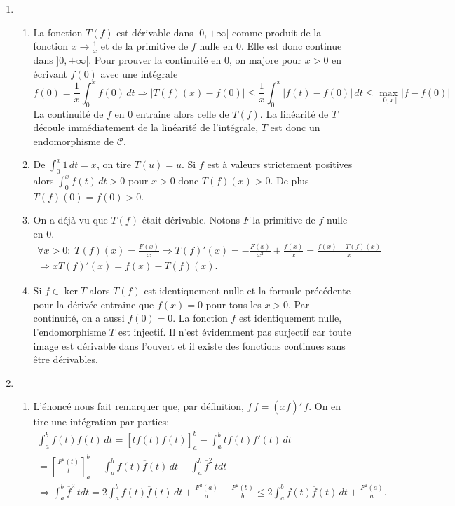 \begin{enumerate}
 \item
\begin{enumerate}
 \item La fonction $T(f)$ est dérivable dans $]0,+\infty[$ comme produit de la fonction $x\rightarrow \frac{1}{x}$ et de la primitive de $f$ nulle en $0$. Elle est donc continue dans $]0,+\infty[$.\newline
\label{cont0} Pour prouver la continuité en $0$, on majore pour $x>0$ en écrivant $f(0)$ avec une intégrale
\begin{displaymath}
 f(0)=\frac{1}{x}\int_0^xf(0)\,dt \Rightarrow 
\left|T(f)(x)-f(0)\right| \leq \frac{1}{x}\int_0^x|f(t) -f(0)|\,dt
\leq \max_{[0,x]}|f-f(0)|  
\end{displaymath}
La continuité de $f$ en $0$ entraine alors celle de $T(f)$. La linéarité de $T$ découle immédiatement de la linéarité de l'intégrale, $T$ est donc un endomorphisme de $\mathcal{C}$.
  
 \item De $\int_0^x1\, dt=x$, on tire $T(u)=u$. Si $f$ est à valeurs strictement positives alors $\int_0^xf(t)\,dt >0$ pour $x>0$ donc $T(f)(x)>0$. De plus $T(f)(0)=f(0)>0$.

 \item On a déjà vu que $T(f)$ était dérivable. Notons $F$ la primitive de $f$ nulle en $0$.
\begin{multline*}
\forall x >0:\;  T(f)(x) = \frac{F(x)}{x} \Rightarrow T(f)'(x) = -\frac{F(x)}{x^2} + \frac{f(x)}{x} = \frac{f(x) - T(f)(x)}{x} \\
\Rightarrow xT(f)'(x) = f(x) - T(f)(x).
\end{multline*}

 \item Si $f\in \ker T$ alors $T(f)$ est identiquement nulle et la formule précédente pour la dérivée entraine que $f(x) = 0$ pour tous les $x>0$. Par continuité, on a aussi $f(0)=0$. La fonction $f$ est identiquement nulle, l'endomorphisme $T$ est injectif.\newline
Il n'est évidemment pas surjectif car toute image est dérivable dans l'ouvert et il existe des fonctions continues sans être dérivables.
\end{enumerate}
 
 \item
\begin{enumerate}
 \item L'énoncé nous fait remarquer que, par définition, $f\,\overline{f} = (x\overline{f})'\,\overline{f}$. On en tire une intégration par parties:
\begin{multline*}
 \int_a^bf(t)\overline{f}(t)\,dt 
= \left[ t\overline{f}(t)\overline{f}(t)\right]_a^b
-\int_a^b t\overline{f}(t)\overline{f}'(t)\,dt \\
 = \left[ \frac{F^2(t)}{t}\right]_a^b -\int_a^b f(t)\overline{f}(t)\, dt + \int_a^b \overline{f}^2\,t dt\\
\Rightarrow
\int_a^b \overline{f}^2\,t dt = 2\int_a^b f(t)\overline{f}(t)\, dt + \frac{F^2(a)}{a} - \frac{F^2(b)}{b} 
\leq 2\int_a^b f(t)\overline{f}(t)\, dt + \frac{F^2(a)}{a}.
\end{multline*}


\end{enumerate}
\end{enumerate}
